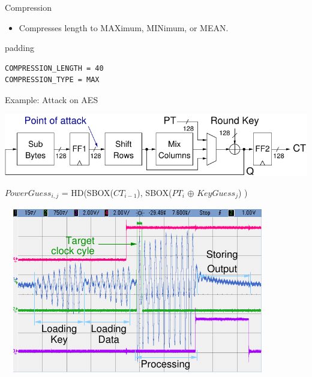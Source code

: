 \documentclass[xcolor=pdftex,dvipsnames,table,final]{beamer}
\begin{document}
\begin{frame}[fragile]{}
\begin{columns}[t]
\begin{column}{.31\linewidth}
\begin{block}{Compression}
\begin{minipage}[t]{0.49\linewidth}
\begin{itemize}
           \item Compresses length to MAXimum, MINimum, or MEAN.
         \end{itemize} 
          \begin{center}
            \begin{beamercolorbox}[rounded=true]{padding}%
               \footnotesize%
              \begin{lstlisting}
COMPRESSION_LENGTH = 40
COMPRESSION_TYPE = MAX
              \end{lstlisting}
            \end{beamercolorbox}
          \end{center}
        \end{minipage}
       \end{block}
       \begin{block}{Example: Attack on AES}
        \vspace{-1ex}
         \begin{center}
           \includegraphics[width=0.9\linewidth]{../figures/aes128}

           {\small $PowerGuess_{i, j}$ = HD(SBOX($CT_{i-1}$), SBOX($PT_{i}$ $\oplus$ $KeyGuess_{j}$) )}
         \end{center}
	 \begin{minipage}[t]{0.49\linewidth}
			~~\includegraphics[width=0.80\linewidth]{../figures/oscilloscope-all-4ch} 
	 

\end{minipage}
\end{block}
\end{column}
\end{columns}
\end{frame}
\end{document}
